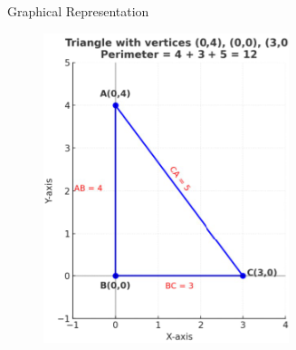 \documentclass{beamer}
\theoremstyle{remark}
\begin{document}
    \begin{frame}{Graphical Representation}
   \begin{figure}[h!]
\centering
\includegraphics[width=0.7\linewidth]{fig1.8.12}

\end{figure}
\end{frame}
\end{document}
